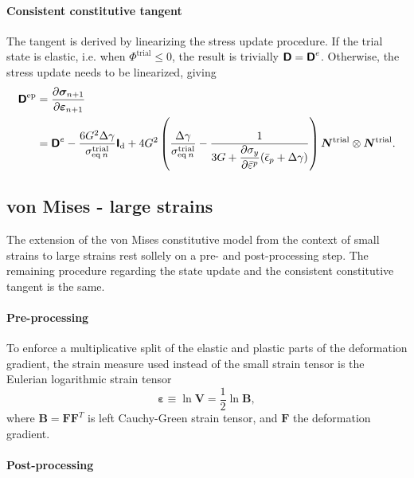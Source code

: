 \paragraph{Consistent constitutive tangent}
The tangent is derived by linearizing the stress update procedure.
If the trial state is elastic, i.e. when \(\Phi^\text{trial} \leq 0\), the result is trivially \(\boldsymbol{\mathsf{D}}=\boldsymbol{\mathsf{D}}^e\).
Otherwise, the stress update needs to be linearized, giving
\begin{equation}
\begin{aligned}
\boldsymbol{\mathsf{D}}^\text{ep} &=\frac{\partial \bm{\sigma}_ {n+1}}{\partial \bm \varepsilon_ {n+1}} \\
&=\boldsymbol{\mathsf{D}}^e-\frac{6 G^{2} \Delta \gamma}{\sigma_{\mathrm{eq}\:n}^\text{trial}} \boldsymbol{\mathsf{I}}_{\mathrm{d}}+4 G^{2}\left(\frac{\Delta \gamma}{\sigma_{\mathrm{eq}\:n}^\text{trial}}-\frac{1}{3 G+ \displaystyle{\frac{\partial \sigma_y}{\partial \bar{\varepsilon}^p}}(\bar{\epsilon}_p+\Delta \gamma)}\right)\bm N^\text{trial} \otimes\bm N^\text{trial}.
\end{aligned}
\end{equation}

\subsection{von Mises - large strains}

The extension of the von Mises constitutive model from the context of small strains to large strains rest sollely on a pre- and post-processing step.
The remaining procedure regarding the state update and the consistent constitutive tangent is the same.

\paragraph{Pre-processing}

To enforce a multiplicative split of the elastic and plastic parts of the deformation gradient, the strain measure used instead of the small strain tensor is the Eulerian logarithmic strain tensor
\begin{equation}
  \bm \varepsilon \equiv \ln \bm V = \frac{1}{2}\ln \bm B,
\end{equation}
where \(\bm B = \bm F\bm F^T\) is left Cauchy-Green strain tensor, and \(\bm F\) the deformation gradient.

\paragraph{Post-processing}

